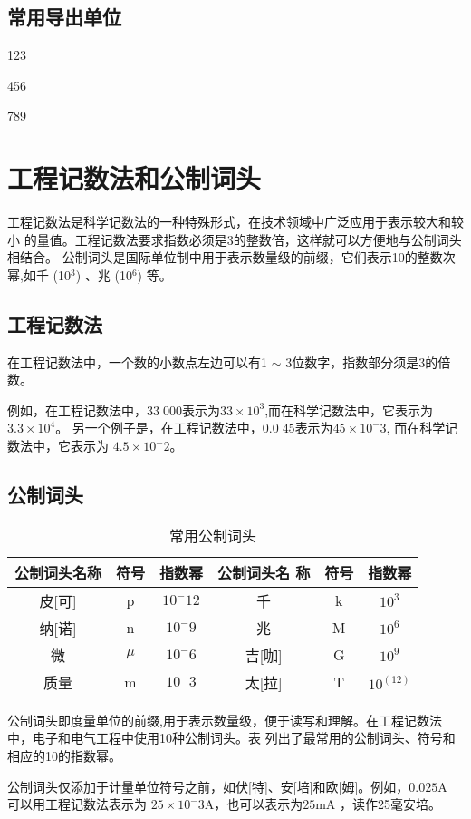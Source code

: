 \subsection{常用导出单位}
123

456

789

\section{工程记数法和公制词头}
工程记数法是科学记数法的一种特殊形式，在技术领域中广泛应用于表示较大和较小
的量值。工程记数法要求指数必须是3的整数倍，这样就可以方便地与公制词头相结合。
公制词头是国际单位制中用于表示数量级的前缀，它们表示10的整数次幂,如千 (10$^3$) 、兆 (10$^6$) 等。
\subsection{工程记数法}
在工程记数法中，一个数的小数点左边可以有1 $\sim$ 3位数字，指数部分须是3的倍数。

例如，在工程记数法中，$33\;000$表示为$33\times 10^3$,而在科学记数法中，它表示为$3.3\times 10^4$。
另一个例子是，在工程记数法中，$0.0\;45$表示为$45\times 10^-3$, 而在科学记数法中，它表示为
 $4.5\times 10^-2$。
 
\subsection{公制词头}

\begin{table*}
\begin{tabular}{cccccc}
\toprule
{\normalsize 公制词头名称}&{\normalsize 符号}&{\normalsize 指数幂}&{\normalsize 公制词头名
称}&{\normalsize 符号}&{\normalsize 指数幂}\\
\midrule
皮[可]  & p             & $10^-12$  &千     &k  &$10^3$\\
纳[诺]  & n             &$10^-9$    &兆     &M  &$10^6$\\     
微     &\textup{$\mu$}  &$10^-6$    &吉[咖] &G  &$10^9$\\
质量    & m             &$10^-3$    &太[拉] &T  &$10^(12)$\\    
\bottomrule
\end{tabular}
\caption[公制词头]{常用公制词头}
\label{tab:prefixes}
\end{table*}

公制词头即度量单位的前缀,用于表示数量级，便于读写和理解。在工程记数法
中，电子和电气工程中使用10种公制词头。表
列出了最常用的公制词头、符号和相应的10的指数幂。

公制词头仅添加于计量单位符号之前，如伏[特]、安[培]和欧[姆]。例如，$0.025$A 可以用工程记数法表示为
$25\times 10^-3$A，也可以表示为$25$mA ，读作25毫安培。
